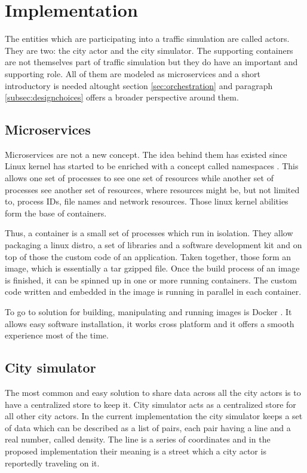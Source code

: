 \documentclass[conference]{IEEEtran}
\begin{document}
\section{Implementation}
\label{sec:implementation}

The entities which are participating into a traffic simulation are called actors. They are two: the city actor and the city simulator. The supporting containers are not themselves part of traffic simulation but they do have an important and supporting role. All of them are modeled as microservices and a short introductory is needed altought section \ref{sec:orchestration} and paragraph \ref{subsec:designchoices} offers a broader perspective around them.

\subsection{Microservices}

Microservices are not a new concept. The idea behind them has existed since Linux kernel has started to be enriched with a concept called namespaces \cite{wiki:linuxns}. This allows one set of processes to see one set of resources while another set of processes see another set of resources, where resources might be, but not limited to, process IDs, file names and network resources. Those linux kernel abilities form the base of containers.

Thus, a container is a small set of processes which run in isolation. They allow packaging a linux distro, a set of libraries and a software development kit and on top of those the custom code of an application. Taken together, those form an image, which is essentially a tar gzipped file. Once the build process of an image is finished, it can be spinned up in one or more running containers. The custom code written and embedded in the image is running in parallel in each container.

To go to solution for building, manipulating and running images is Docker \cite{docker}. It allows easy software installation, it works cross platform and it offers a smooth experience most of the time.

\subsection{City simulator}
\label{subsection:citysimulator}

The most common and easy solution to share data across all the city actors is to have a centralized store to keep it. City simulator acts as a centralized store for all other city actors. In the current implementation the city simulator keeps a set of data which can be described as a list of pairs, each pair having a line and a real number, called density. The line is a series of coordinates and in the proposed implementation their meaning is a street which a city actor is reportedly traveling on it.
\end{document}
